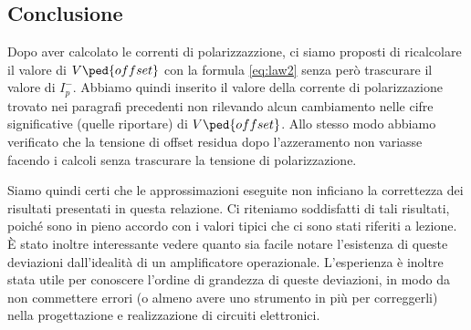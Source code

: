 \subsection{Conclusione}

Dopo aver calcolato le correnti di polarizzazzione, ci siamo proposti di ricalcolare
il valore di $V\ped{offset}$ con la formula \eqref{eq:law2} senza però trascurare il valore di
$I_p^-$. Abbiamo quindi inserito il valore della corrente di polarizzazione trovato nei
paragrafi precedenti non rilevando alcun cambiamento nelle cifre significative (quelle riportare)
di $V\ped{offset}$. Allo stesso modo abbiamo verificato che la tensione di offset residua
dopo l'azzeramento non variasse facendo i calcoli senza trascurare la tensione di polarizzazione.

Siamo quindi certi che le approssimazioni eseguite non inficiano la correttezza dei
risultati presentati in questa relazione. Ci riteniamo soddisfatti di tali risultati, poiché
sono in pieno accordo con i valori tipici che ci sono stati riferiti a lezione.
È stato inoltre interessante vedere quanto sia facile notare l'esistenza di queste deviazioni dall'idealità
di un amplificatore operazionale. L'esperienza è inoltre stata utile per conoscere l'ordine di grandezza di queste
deviazioni, in modo da non commettere errori (o almeno avere uno strumento in più per correggerli)
nella progettazione e realizzazione di circuiti elettronici.

